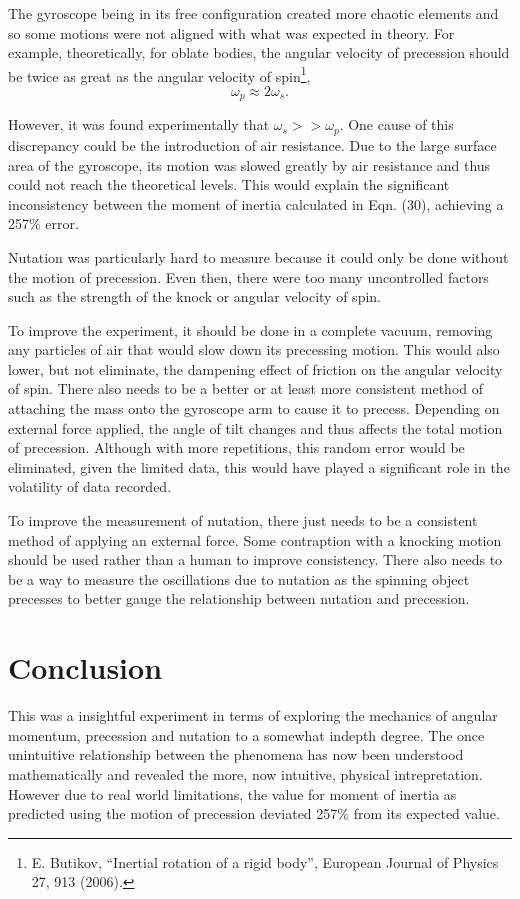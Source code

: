 \documentclass{article}
\begin{document}
The gyroscope being in its free configuration created more chaotic elements and so 
some motions were not aligned with what was expected in theory. For example, theoretically,
for oblate bodies, the angular velocity of precession should be twice as great 
as the angular velocity of spin\footnote{E. Butikov, “Inertial rotation of a rigid body”, European 
Journal of Physics 27, 913 (2006).},
\begin{equation}
    \omega_p \approx 2\omega_s.
\end{equation}

However, it was found experimentally that $\omega_s >> \omega_p$. One cause of this 
discrepancy could be the introduction of air resistance. Due to the large surface area 
of the gyroscope, its motion was slowed greatly by air resistance and thus could not 
reach the theoretical levels. This would explain the significant inconsistency between
the moment of inertia calculated in Eqn. (30), achieving a 257\% error.

Nutation was particularly hard to measure because it could only be done without the 
motion of precession. Even then, there were too many uncontrolled factors such as the 
strength of the knock or angular velocity of spin. 

To improve the experiment, it should be done in a complete vacuum, removing any particles of air
that would slow down its precessing motion. This would also lower, but not eliminate, the dampening 
effect of friction on the angular velocity of spin. There also needs to be a better or at least more
consistent method of attaching the mass onto the gyroscope arm to cause it to precess. Depending on 
external force applied, the angle of tilt changes and thus affects the total motion of precession.
Although with more repetitions, this random error would be eliminated, given the limited data, this 
would have played a significant role in the volatility of data recorded.

To improve the measurement of nutation, there just needs to be a consistent method of applying
an external force. Some contraption with a knocking motion should be used rather than a human to 
improve consistency. There also needs to be a way to measure the oscillations due to nutation as
the spinning object precesses to better gauge the relationship between nutation and precession.

\section{Conclusion}
This was a insightful experiment in terms of exploring the mechanics of angular momentum, precession 
and nutation to a somewhat indepth degree. The once unintuitive relationship between the phenomena has
now been understood mathematically and revealed the more, now intuitive, physical intrepretation. However
due to real world limitations, the value for moment of inertia as predicted using the 
motion of precession deviated 257\% from its expected value.
\end{document}
